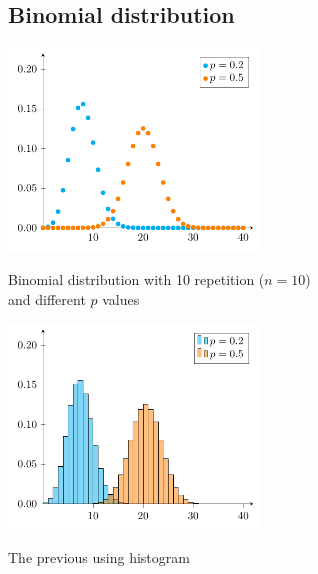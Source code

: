 \documentclass[a4paper]{article}
\begin{document}
	\subsection{Binomial distribution}
		\begin{multicols}{2}
		\centering
		\includegraphics[width=0.5\textwidth]{Binomial-distribution}		
		
		Binomial distribution with 10 repetition ($n=10$)\\ and different $p$ values
		\columnbreak
				
		\includegraphics[width=0.5\textwidth]{Binomial-distribution-histogram}		
				
		The previous using histogram
		\end{multicols}
	
	\clearpage
\end{document}
